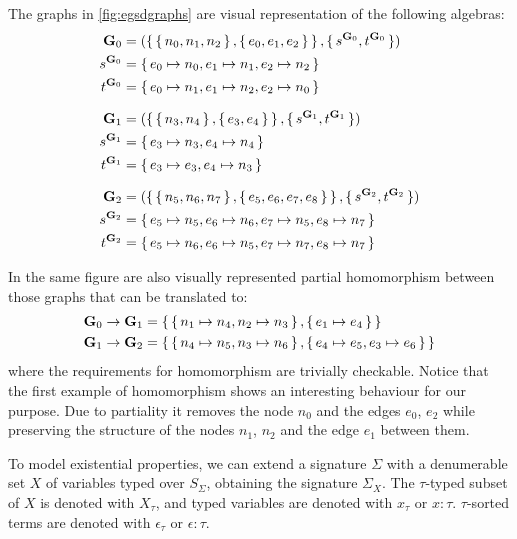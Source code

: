 \begin{example}
The graphs in \autoref{fig:egsdgraphs} are visual representation of the following algebras:
\begin{align*}
  \mathbf{G}_0 &= (\set{\set{n_0, n_1, n_2},\set{e_0, e_1, e_2}}, \set{s^{\mathbf{G}_0}, t^{\mathbf{G}_0}}) \\
  s^{\mathbf{G}_0} &= \set{e_0 \mapsto n_0, e_1 \mapsto n_1, e_2 \mapsto n_2} \\
  t^{\mathbf{G}_0} &= \set{e_0 \mapsto n_1, e_1 \mapsto n_2, e_2 \mapsto n_0} \\[1.5ex]
  \mathbf{G}_1 &= (\set{\set{n_3,n_4},\set{e_3,e_4}},\set{s^{\mathbf{G}_1},t^{\mathbf{G}_1}}) \\
  s^{\mathbf{G}_1} &= \set{e_3 \mapsto n_3, e_4 \mapsto n_4} \\
  t^{\mathbf{G}_1} &= \set{e_3 \mapsto e_3, e_4 \mapsto n_3} \\[1.5ex]
  \mathbf{G}_2 &= (\set{\set{n_5,n_6,n_7},\set{e_5,e_6,e_7,e_8}},\set{s^{\mathbf{G}_2},t^{\mathbf{G}_2}}) \\
  s^{\mathbf{G}_2} &= \set{e_5 \mapsto n_5,e_6 \mapsto n_6,e_7\mapsto n_5, e_8 \mapsto n_7} \\
  t^{\mathbf{G}_2} &= \set{e_5 \mapsto n_6,e_6 \mapsto n_5,e_7 \mapsto n_7, e_8 \mapsto n_7}
\end{align*}

In the same figure are also visually represented partial homomorphism between those graphs that can be translated to:
\begin{align*}
  \mathbf{G}_0 \to \mathbf{G}_1 &= \set{\set{n_1 \mapsto n_4,n_2 \mapsto n_3},\set{e_1 \mapsto e_4}} \\
  \mathbf{G}_1 \to \mathbf{G}_2 &= \set{\set{n_4 \mapsto n_5, n_3 \mapsto n_6},\set{e_4 \mapsto e_5, e_3 \mapsto e_6}}
\end{align*}
 where the
requirements for homomorphism are trivially checkable. Notice that the first example of homomorphism shows an interesting
behaviour for our purpose. Due to partiality it removes the node $n_0$ and the edges $e_0$, $e_2$ while preserving the
structure of the nodes $n_1$, $n_2$ and the edge $e_1$ between them.
\end{example}

To model existential properties, we can extend a signature $\Sigma$ with a denumerable set $X$ of variables typed over
$S_\Sigma$, obtaining the signature $\Sigma_X$. The $\tau$-typed subset of $X$ is denoted with $X_\tau$, and typed
variables are denoted with $x_\tau$ or $x : \tau$. $\tau$-sorted terms are denoted with $\epsilon_\tau$ or $\epsilon :
\tau$.

